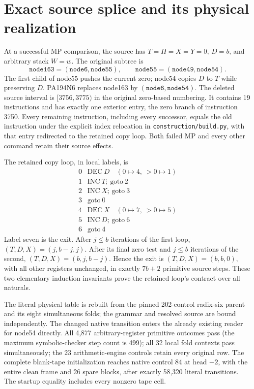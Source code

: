 \section{Exact source splice and its physical realization}

At a successful MP comparison, the source has $T=H=X=Y=0$, $D=b$, and
arbitrary stack $W=w$. The original subtree is
\[
 \texttt{node163}=(\texttt{node6},\texttt{node55}),\qquad
 \texttt{node55}=(\texttt{node49},\texttt{node54}).
\]
The first child of node55 pushes the current zero; node54 copies $D$ to
$T$ while preserving $D$. PA194N6 replaces node163 by
$(\texttt{node6},\texttt{node54})$.
The deleted source interval is $[3756,3775)$ in the original zero-based
numbering. It contains 19 instructions and has exactly one exterior
entry, the zero branch of instruction 3750. Every remaining instruction,
including every successor, equals the old instruction under the explicit
index relocation in \texttt{construction/build.py}, with that entry redirected
to the retained copy loop. Both failed MP and every other command retain
their source effects.

The retained copy loop, in local labels, is
\[
\begin{array}{c|l}
0&\mathrm{DEC}\ D\quad(0\mapsto4,\ >0\mapsto1)\\
1&\mathrm{INC}\ T;\ \mathrm{goto}\ 2\\
2&\mathrm{INC}\ X;\ \mathrm{goto}\ 3\\
3&\mathrm{goto}\ 0\\
4&\mathrm{DEC}\ X\quad(0\mapsto7,\ >0\mapsto5)\\
5&\mathrm{INC}\ D;\ \mathrm{goto}\ 6\\
6&\mathrm{goto}\ 4
\end{array}
\]
Label seven is the exit. After $j\le b$ iterations of the first loop,
$(T,D,X)=(j,b-j,j)$. After its final zero test and $j\le b$ iterations
of the second, $(T,D,X)=(b,j,b-j)$. Hence the exit is
$(T,D,X)=(b,b,0)$, with all other registers unchanged, in exactly
$7b+2$ primitive source steps. These two elementary induction invariants
prove the retained loop's contract over all naturals.

The literal physical table is rebuilt from the pinned 202-control
radix-six parent and its eight simultaneous folds; the grammar and
resolved source are bound independently. The changed native transition enters the already existing reader
for node54 directly. All 4,877 arbitrary-register primitive outcomes pass
(the maximum symbolic-checker step count is 499); all 32 local fold
contexts pass simultaneously; the 23 arithmetic-engine controls retain
every original row. The complete blank-tape initialization reaches native
control 84 at head $-2$, with the entire clean frame and 26 spare blocks,
after exactly 58,320 literal transitions. The startup equality includes
every nonzero tape cell.

